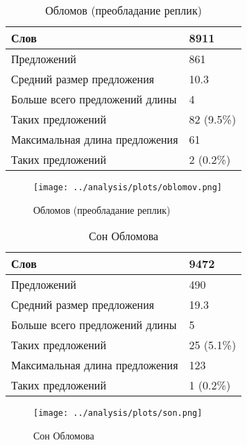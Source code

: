\documentclass{kursa4}
\begin{document}
      \begin{table}
        \centering
        \tablehead{}
        \begin{tabular}{|m{10cm}|m{3cm}|}
          \hline
          Слов & 8911\\\hline
          Предложений & 861\\\hline
          Средний размер предложения & 10.3\\\hline
          Больше всего предложений длины & 4\\\hline
          Таких предложений & 82 (9.5\%)\\\hline
          Максимальная длина предложения & 61\\\hline
          Таких предложений & 2 (0.2\%)\\\hline
        \end{tabular}
        \caption{Обломов (преобладание реплик)}
      \end{table}
      
      \begin{figure}[htbp] \centering
        \texttt{[image: ../analysis/plots/oblomov.png]}
        \caption{Обломов (преобладание реплик)}
      \end{figure}


      \begin{table}
        \centering
        \tablehead{}
        \begin{tabular}{|m{10cm}|m{3cm}|}
          \hline
          Слов & 9472\\\hline
          Предложений & 490\\\hline
          Средний размер предложения & 19.3\\\hline
          Больше всего предложений длины & 5\\\hline
          Таких предложений & 25 (5.1\%)\\\hline
          Максимальная длина предложения & 123\\\hline
          Таких предложений & 1 (0.2\%)\\\hline
          \end{tabular}
        \caption{Сон Обломова}
        \end{table}
      
      \begin{figure}[htbp] \centering
        \texttt{[image: ../analysis/plots/son.png]}
        \caption{Сон Обломова}
      \end{figure}      
\end{document}
